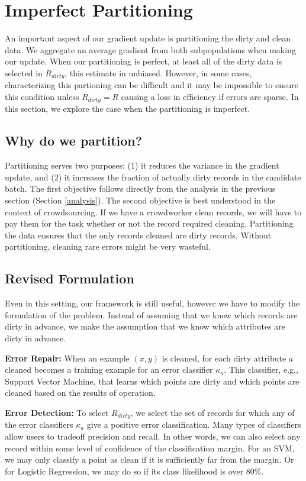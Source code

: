 \section{Imperfect Partitioning}
An important aspect of our gradient update is partitioning the dirty and clean data.
We aggregate an average gradient from both subpopulations when making our update.
When our partitioning is perfect, at least all of the dirty data is selected in $R_{dirty}$, this estimate in unbiased.
However, in some cases, characterizing this partioning can be difficult and it may be impossible to ensure this condition unless $R_{dirty} = R$ causing a loss in efficiency if errors are sparse.  
In this section, we explore the case when the partitioning is imperfect.

\subsection{Why do we partition?}
Partitioning serves two purposes: (1) it reduces the variance in the gradient update, and (2) it increases the fraction of actually dirty records in the candidate batch.
The first objective follows directly from the analysis in the previous section (Section \ref{analysis}).
The second objective is best understood in the context of crowdsourcing.
If we have a crowdworker clean records, we will have to pay them for the task whether or not the record required cleaning.
Partitioning the data ensures that the only records cleaned are dirty records.
Without partitioning, cleaning rare errors might be very wasteful. 

\subsection{Revised Formulation}
Even in this setting, our framework is still useful, however we have to modify the formulation of the problem.
Instead of assuming that we know which records are dirty in advance, we make the assumption that we know which attributes are dirty in advance.

\noindent\textbf{Error Repair: } When an example $(x,y)$ is cleaned, for each dirty attribute $a$ cleaned becomes a training example for an error classifier $\kappa_a$. This classifier, e.g., Support Vector Machine, that learns which points are dirty and which points are cleaned based on the results of operation.

\noindent\textbf{Error Detection: } To select $R_{dirty}$, we select the set of records for which any of the error classifiers $\kappa_a$ give a positive error classification.
Many types of classifiers allow users to tradeoff precision and recall.
In other words, we can also select any record within some level of confidence of the classification margin.
For an SVM, we may only classify a point as clean if it is sufficiently far from the margin.
Or for Logistic Regression, we may do so if its class likelihood is over 80\%.

